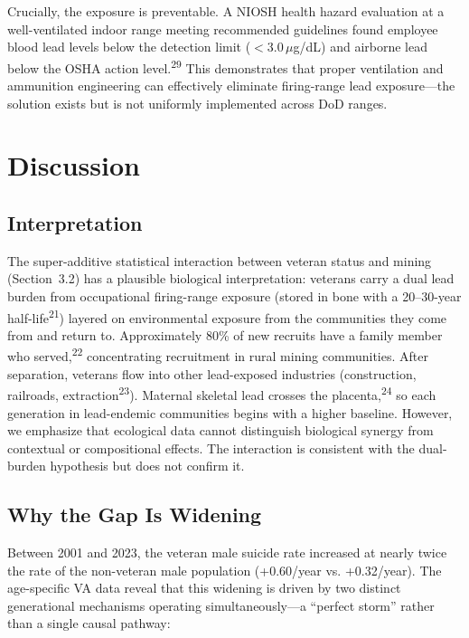 \documentclass[11pt,twocolumn]{article}
\begin{document}
Crucially, the exposure is preventable. A NIOSH health hazard evaluation at a well-ventilated indoor range meeting recommended guidelines found employee blood lead levels below the detection limit ($<$3.0\,$\mu$g/dL) and airborne lead below the OSHA action level.\textsuperscript{29} This demonstrates that proper ventilation and ammunition engineering can effectively eliminate firing-range lead exposure---the solution exists but is not uniformly implemented across DoD ranges.


\section{Discussion}

\subsection{Interpretation}

The super-additive statistical interaction between veteran status and mining (Section~3.2) has a plausible biological interpretation: veterans carry a dual lead burden from occupational firing-range exposure (stored in bone with a 20--30-year half-life\textsuperscript{21}) layered on environmental exposure from the communities they come from and return to. Approximately 80\% of new recruits have a family member who served,\textsuperscript{22} concentrating recruitment in rural mining communities. After separation, veterans flow into other lead-exposed industries (construction, railroads, extraction\textsuperscript{23}). Maternal skeletal lead crosses the placenta,\textsuperscript{24} so each generation in lead-endemic communities begins with a higher baseline. However, we emphasize that ecological data cannot distinguish biological synergy from contextual or compositional effects. The interaction is consistent with the dual-burden hypothesis but does not confirm it.


\subsection{Why the Gap Is Widening}

Between 2001 and 2023, the veteran male suicide rate increased at nearly twice the rate of the non-veteran male population (+0.60/year vs. +0.32/year). The age-specific VA data reveal that this widening is driven by two distinct generational mechanisms operating simultaneously---a ``perfect storm'' rather than a single causal pathway:
\end{document}
